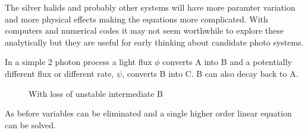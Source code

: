 




The silver halids
and probably other systems will have more paramter variation and
more physical effects making the equations more complicated. With computers
and numerical codes it may not seem worthwhile to explore these 
analytically but they are useful for early thinking about 
candidate photo systems. 

In a simple  2 photon process a light flux $\phi$ converts A into B
and a potentially different flux or different rate, $\psi$,  converts
B into C. B can also decay back to A. 

\begin{figure}[htb]
\centering







\caption{ With loss of unstable intermediate B   }
\label{fig:loss} 
\end{figure}

As before variables can be eliminated and a single higher order
linear equation can be solved. 

